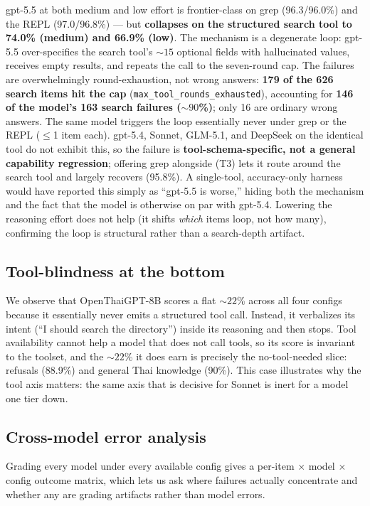 \documentclass[11pt]{article}
\begin{document}
gpt-5.5 at both medium and low effort is frontier-class on grep (96.3/96.0\%) and the REPL
(97.0/96.8\%) --- but \textbf{collapses on the structured search tool to 74.0\% (medium) and 66.9\%
(low)}. The mechanism is a degenerate loop: gpt-5.5 over-specifies the search tool's ${\sim}15$ optional
fields with hallucinated values, receives empty results, and repeats the call to the seven-round cap.
The failures are overwhelmingly round-exhaustion, not wrong answers: \textbf{179 of the 626 search items
hit the cap} (\texttt{max\_tool\_rounds\_exhausted}), accounting for \textbf{146 of the model's 163
search failures (${\sim}90$\%)}; only 16 are ordinary wrong answers. The same model triggers the loop
essentially never under grep or the REPL ($\le$1 item each). gpt-5.4, Sonnet, GLM-5.1, and DeepSeek on
the identical tool do not exhibit this, so the failure is \textbf{tool-schema-specific, not a general
capability regression}; offering grep alongside (T3) lets it route around the search tool and largely
recovers (95.8\%). A single-tool, accuracy-only harness would have reported this simply as ``gpt-5.5 is
worse,'' hiding both the mechanism and the fact that the model is otherwise on par with gpt-5.4.
Lowering the reasoning effort does not help (it shifts \emph{which} items loop, not how many),
confirming the loop is structural rather than a search-depth artifact.

\subsection{Tool-blindness at the bottom}

We observe that OpenThaiGPT-8B scores a flat ${\sim}22$\% across all four configs because it
essentially never emits a structured tool call. Instead, it verbalizes its intent (``I should search
the directory'') inside its reasoning and then stops. Tool availability cannot help a model that does
not call tools, so its score is invariant to the toolset, and the ${\sim}22$\% it does earn is precisely
the no-tool-needed slice: refusals (88.9\%) and general Thai knowledge (90\%). This case illustrates
why the tool axis matters: the same axis that is decisive for Sonnet is inert for a model one tier down.

\subsection{Cross-model error analysis}

Grading every model under every available config gives a per-item $\times$ model $\times$ config outcome
matrix, which lets us ask where failures actually concentrate and whether any are grading artifacts
rather than model errors.
\end{document}
